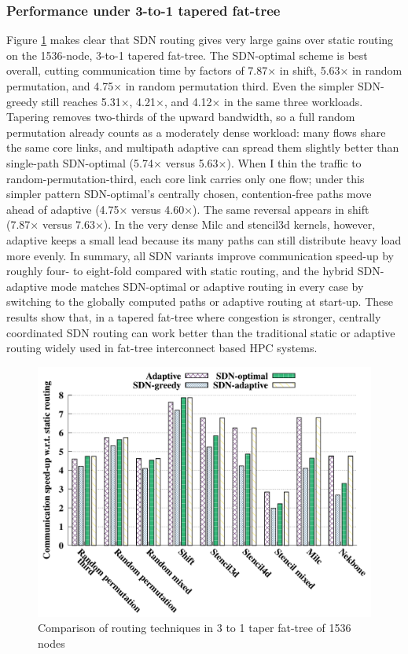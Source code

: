 \subsubsection{Performance under 3-to-1 tapered fat-tree}
Figure \ref{fig:routing_taper} makes clear that SDN routing gives very large gains over static routing on the 1536-node, 3-to-1 tapered fat-tree. The SDN-optimal scheme is best overall, cutting communication time by factors of 7.87× in shift, 5.63× in random permutation, and 4.75× in random permutation third. Even the simpler SDN-greedy still reaches 5.31×, 4.21×, and 4.12× in the same three workloads. 
Tapering removes two-thirds of the upward bandwidth, so a full random permutation already counts as a moderately dense workload: many flows share the same core links, and multipath adaptive can spread them slightly better than single-path SDN-optimal (5.74× versus 5.63×). When I thin the traffic to random-permutation-third, each core link carries only one flow; under this simpler pattern SDN-optimal’s centrally chosen, contention-free paths move ahead of adaptive (4.75× versus 4.60×). The same reversal appears in shift (7.87× versus 7.63×). In the very dense Milc and stencil3d kernels, however, adaptive keeps a small lead because its many paths can still distribute heavy load more evenly.
In summary, all SDN variants improve communication speed-up by roughly four- to eight-fold compared with static routing, and the hybrid SDN-adaptive mode matches SDN-optimal or adaptive routing in every case by switching to the globally computed paths or adaptive routing at start-up. These results show that, in a tapered fat-tree where congestion is stronger, centrally coordinated SDN routing can work better than the traditional static or adaptive routing widely used in fat-tree interconnect based HPC systems.
\begin{figure}[h]
  \centering
  \includegraphics[width=\columnwidth]{./figs_4/routing_taper.pdf}
  \caption{Comparison of routing techniques in 3 to 1 taper fat-tree of 1536 nodes}
  \label{fig:routing_taper}
\end{figure}
